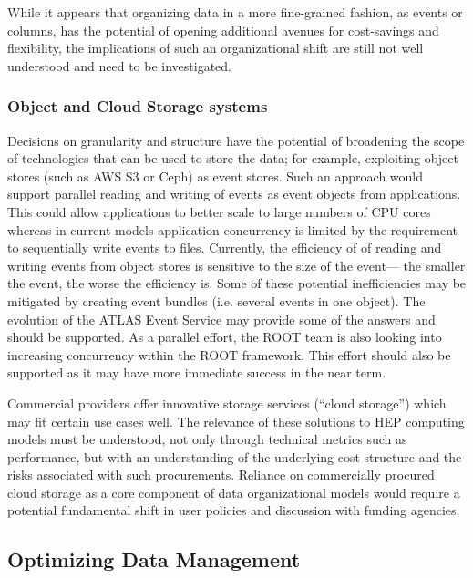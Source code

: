 \documentclass[12pt,a4paper]{article}
\begin{document}
While it appears that organizing data in a more fine-grained fashion, as
events or columns, has the potential of opening additional avenues for
cost-savings and flexibility, the implications of such an organizational
shift are still not well understood and need to be investigated.

\subsubsection{Object and Cloud Storage
systems}\label{object-and-cloud-storage-systems}

Decisions on granularity and structure have the potential of broadening
the scope of technologies that can be used to store the data; for
example, exploiting object stores (such as AWS S3 or Ceph) as event stores. Such an approach
would support parallel reading and writing of events as
event objects from applications. This could allow applications to better
scale to large numbers of CPU cores whereas in current models application
concurrency is limited by the requirement to sequentially write events
to files. Currently, the efficiency of of reading and writing events
from object stores is sensitive to the size of the event---
the smaller the event, the worse the efficiency is. Some of these potential inefficiencies
may be mitigated by creating event bundles (i.e. several events in one object). The
evolution of the ATLAS Event Service may provide some of the answers and
should be supported. As a parallel effort, the ROOT team is also looking
into increasing concurrency within the ROOT framework. This effort
should also be supported as it may have more immediate success in the
near term.

Commercial providers offer innovative storage services (``cloud
storage'') which may fit certain use cases well. The relevance of these
solutions to HEP computing models must be understood, not only through
technical metrics such as performance, but with an understanding of the
underlying cost structure and the risks associated with such
procurements. Reliance on commercially procured cloud storage as a core
component of data organizational models would require a potential
fundamental shift in user policies and discussion with funding agencies.

\subsection{Optimizing Data Management}\label{optimizing-data-management}
\end{document}
